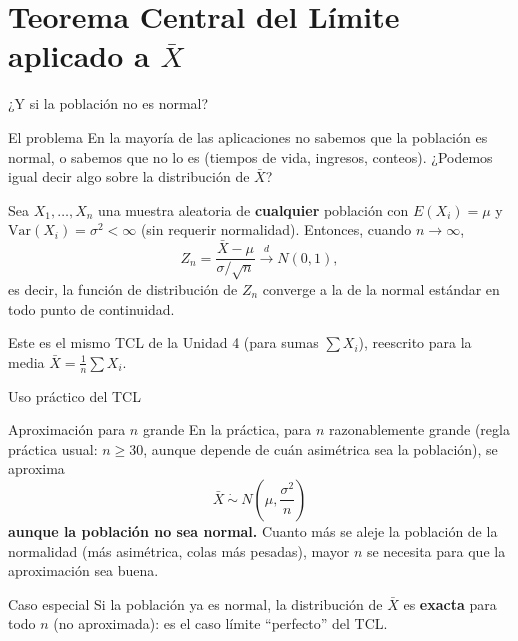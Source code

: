 \documentclass[aspectratio=169,11pt]{beamer}
\begin{document}
\section{Teorema Central del Límite aplicado a $\bar X$}

\begin{frame}{¿Y si la población no es normal?}
\begin{alertblock}{El problema}
En la mayoría de las aplicaciones no sabemos que la población es normal, o sabemos que no lo es (tiempos de vida, ingresos, conteos). ¿Podemos igual decir algo sobre la distribución de $\bar X$?
\end{alertblock}

\begin{theorem}
Sea $X_1,\dots,X_n$ una muestra aleatoria de \textbf{cualquier} población con $E(X_i)=\mu$ y $\text{Var}(X_i)=\sigma^2<\infty$ (sin requerir normalidad). Entonces, cuando $n\to\infty$,
$$Z_n = \frac{\bar X - \mu}{\sigma/\sqrt n} \xrightarrow{d} N(0,1),$$
es decir, la función de distribución de $Z_n$ converge a la de la normal estándar en todo punto de continuidad.
\end{theorem}

Este es el mismo TCL de la Unidad 4 (para sumas $\sum X_i$), reescrito para la media $\bar X = \frac{1}{n}\sum X_i$.
\end{frame}

\begin{frame}{Uso práctico del TCL}
\begin{block}{Aproximación para $n$ grande}
En la práctica, para $n$ razonablemente grande (regla práctica usual: $n\geq 30$, aunque depende de cuán asimétrica sea la población), se aproxima
$$\bar X \ \dot\sim\ N\left(\mu, \frac{\sigma^2}{n}\right)$$
\textbf{aunque la población no sea normal.} Cuanto más se aleje la población de la normalidad (más asimétrica, colas más pesadas), mayor $n$ se necesita para que la aproximación sea buena.
\end{block}

\begin{alertblock}{Caso especial}
Si la población ya es normal, la distribución de $\bar X$ es \textbf{exacta} para todo $n$ (no aproximada): es el caso límite ``perfecto'' del TCL.
\end{alertblock}
\end{frame}
\end{document}
